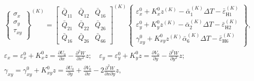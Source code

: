 \begin{gather}

\label{bitkina:eq1}

\left\{

\begin{array}{c}

 \sigma _x  \\

 \sigma _y  \\

 \tau _{xy} \\

\end{array}

\right\}^{(K)}{\!\!\!\!\!\!=}\begin{bmatrix}\bar Q_{11} & \bar Q_{12} & \bar Q_{16} \\

\bar Q_{21}  & \bar Q_{22}  & \bar Q_{26}\\

\bar Q_{16}  & \bar Q_{26}  & \bar Q_{66}

\end{bmatrix}^{(K)} \left\{ \begin{array}{c}

\varepsilon_x^0 + K_x^0 z^{(K)}- \bar \alpha _1^{(K)} \Delta T-\bar \varepsilon _{Н1}^{(K)}  \\

\varepsilon_y^0 + K_y^0 z^{(K)}-\bar \alpha _2^{(K)} \Delta T-\bar \varepsilon_{Н2}^{(K)}\\

\gamma _{xy}^0 + K_{xy}^0 z^{(K)}\bar \alpha_6^{(K)} \Delta T-\bar \varepsilon_{Н6}^{(K)}

\end{array} \right\},

\\

\varepsilon_x =\varepsilon _x^0 +K_x^0   z=\frac{\partial U_0 }{\partial x}-\frac{\partial^2W}{\partial x^2}  z; \quad 

\varepsilon _y =\varepsilon _y^0 +K_y^0   z=\frac{\partial

V_0 }{\partial y}-\frac{\partial ^2W}{\partial y^2}  z; \\

\gamma _{xy} =\gamma _{xy}^0+K_{xy}^0   z=\frac{\partial

U_0 }{\partial y}+\frac{\partial V_0 }{\partial x}-2\frac{\partial

^2W}{\partial x \partial y}  z,

\end{gather}

